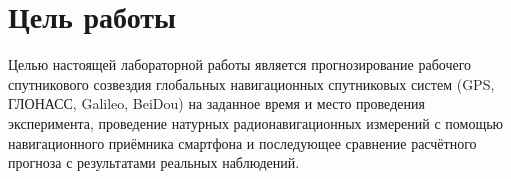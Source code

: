 \section{Цель работы}

Целью настоящей лабораторной работы является прогнозирование рабочего спутникового созвездия глобальных навигационных спутниковых систем (GPS, ГЛОНАСС, Galileo, BeiDou) на заданное время и место проведения эксперимента, проведение натурных радионавигационных измерений с помощью навигационного приёмника смартфона и последующее сравнение расчётного прогноза с результатами реальных наблюдений.

